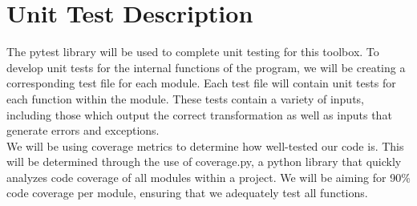 \documentclass[12pt, titlepage]{article}
\begin{document}
    
\begin{table}[H]
\centering
{}
\caption{Traceability Matrix Showing the Connections Between Non Functional Requirements and their test.}
\label{Table:trace}
\end{table}


\section{Unit Test Description}

The pytest library will be used to complete unit testing for this toolbox. To develop unit tests for the internal functions of the program, we will be creating a corresponding test file for each module. Each test file will contain unit tests for each function within the module. These tests contain a variety of inputs, including those which output the correct transformation as well as inputs that generate errors and exceptions. \\

\noindent We will be using coverage metrics to determine how well-tested our code is. This will be determined through the use of coverage.py, a python library that quickly analyzes code coverage of all modules within a project. We will be aiming for 90\% code coverage per module, ensuring that we adequately test all functions. 
\end{document}
